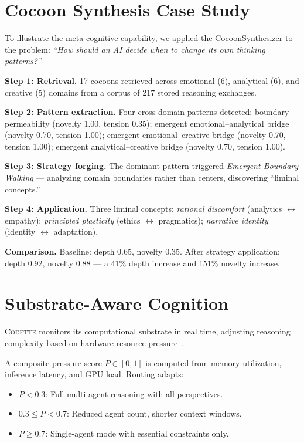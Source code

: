 \documentclass[11pt,a4paper]{article}
\newcommand{\codette}{\textsc{Codette}}
\begin{document}
\section{Cocoon Synthesis Case Study}
\label{sec:casestudy}

To illustrate the meta-cognitive capability, we applied the CocoonSynthesizer
to the problem: \emph{``How should an AI decide when to change its own thinking
patterns?''}

\textbf{Step 1: Retrieval.} 17 cocoons retrieved across emotional (6),
analytical (6), and creative (5) domains from a corpus of 217 stored reasoning
exchanges.

\textbf{Step 2: Pattern extraction.} Four cross-domain patterns detected:
boundary permeability (novelty 1.00, tension 0.35); emergent
emotional--analytical bridge (novelty 0.70, tension 1.00); emergent
emotional--creative bridge (novelty 0.70, tension 1.00); emergent
analytical--creative bridge (novelty 0.70, tension 1.00).

\textbf{Step 3: Strategy forging.} The dominant pattern triggered
\emph{Emergent Boundary Walking} --- analyzing domain boundaries rather than
centers, discovering ``liminal concepts.''

\textbf{Step 4: Application.} Three liminal concepts: \emph{rational
discomfort} (analytics $\leftrightarrow$ empathy); \emph{principled
plasticity} (ethics $\leftrightarrow$ pragmatics); \emph{narrative identity}
(identity $\leftrightarrow$ adaptation).

\textbf{Comparison.} Baseline: depth 0.65, novelty 0.35. After strategy
application: depth 0.92, novelty 0.88 --- a 41\% depth increase and 151\%
novelty increase.

\section{Substrate-Aware Cognition}
\label{sec:substrate}

\codette{} monitors its computational substrate in real time, adjusting
reasoning complexity based on hardware resource
pressure~\citep{hockey1997compensatory,sterling2012allostasis}.

A composite pressure score $P \in [0,1]$ is computed from memory utilization,
inference latency, and GPU load. Routing adapts:
\begin{itemize}[nosep]
  \item $P < 0.3$: Full multi-agent reasoning with all perspectives.
  \item $0.3 \leq P < 0.7$: Reduced agent count, shorter context windows.
  \item $P \geq 0.7$: Single-agent mode with essential constraints only.
\end{itemize}
\end{document}

